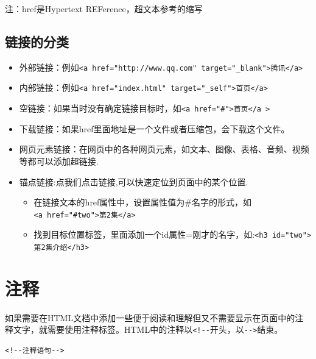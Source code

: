 \documentclass[
]{book}
\providecommand{\tightlist}{%
  \setlength{\itemsep}{0pt}\setlength{\parskip}{0pt}}
\begin{document}
注：href是Hypertext REFerence，超文本参考的缩写

\hypertarget{ux94feux63a5ux7684ux5206ux7c7b}{%
\subsection{链接的分类}\label{ux94feux63a5ux7684ux5206ux7c7b}}

\begin{itemize}
\tightlist
\item
  外部链接：例如\texttt{\textless{}a\ href="http://www.qq.com"\ target="\_blank"\textgreater{}腾讯\textless{}/a\textgreater{}}
\item
  内部链接：例如\texttt{\textless{}a\ href="index.html"\ target="\_self"\textgreater{}首页\textless{}/a\textgreater{}}
\item
  空链接：如果当时没有确定链接目标时，如\texttt{\textless{}a\ href="\#"\textgreater{}首页\textless{}/a\ \textgreater{}}
\item
  下载链接：如果href里面地址是一个文件或者压缩包，会下载这个文件。
\item
  网页元素链接：在网页中的各种网页元素，如文本、图像、表格、音频、视频等都可以添加超链接.
\item
  锚点链接:点我们点击链接,可以快速定位到页面中的某个位置.

  \begin{itemize}
  \tightlist
  \item
    在链接文本的href属性中，设置属性值为\#名字的形式，如\texttt{\textless{}a\ href="\#two"\textgreater{}第2集\textless{}/a\textgreater{}}
  \item
    找到目标位置标签，里面添加一个id属性=刚才的名字，如:\texttt{\textless{}h3\ id="two"\textgreater{}第2集介绍\textless{}/h3\textgreater{}}
  \end{itemize}
\end{itemize}

\hypertarget{ux6ce8ux91ca}{%
\section{注释}\label{ux6ce8ux91ca}}

如果需要在HTML文档中添加一些便于阅读和理解但又不需要显示在页面中的注释文字，就需要使用注释标签。HTML中的注释以\texttt{\textless{}!-\/-}开头，以\texttt{-\/-\textgreater{}}结束。

\begin{verbatim}
<!--注释语句-->
\end{verbatim}
\end{document}
